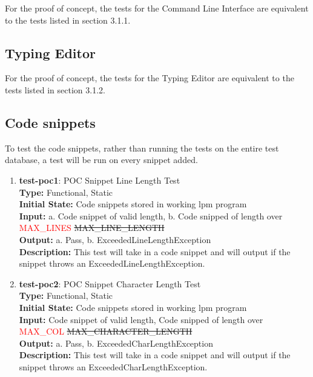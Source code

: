 \documentclass[12pt, titlepage]{article}
\begin{document}
For the proof of concept, the tests for the Command Line Interface are equivalent to the tests listed in section 3.1.1.

\subsection{Typing Editor}

For the proof of concept, the tests for the Typing Editor are equivalent to the tests listed in section 3.1.2.

\subsection{Code snippets}

To test the code snippets, rather than running the tests on the entire test database, a test will be run on every snippet added.

\begin{enumerate}

\item{\textbf{test-poc1}: POC Snippet Line Length Test\\}
\textbf{Type:} Functional, Static \\
\textbf{Initial State:} Code snippets stored in working lpm program\\
\textbf{Input:} a. Code snippet of valid length, b. Code snipped of length over \textcolor{red}{MAX\_LINES} \sout{MAX\_LINE\_LENGTH}\\
\textbf{Output:} a. Pass, b. ExceededLineLengthException \\
\textbf{Description:} This test will take in a code snippet and will output if the snippet throws an ExceededLineLengthException.\\

\item{\textbf{test-poc2}: POC Snippet Character Length Test\\}
\textbf{Type:} Functional, Static \\
\textbf{Initial State:} Code snippets stored in working lpm program\\
\textbf{Input:} Code snippet of valid length, Code snipped of length over \textcolor{red}{MAX\_COL} \sout{MAX\_CHARACTER\_LENGTH}\\
\textbf{Output:} a. Pass, b. ExceededCharLengthException \\
\textbf{Description:} This test will take in a code snippet and will output if the snippet throws an ExceededCharLengthException.\\

\end{enumerate}
\end{document}

